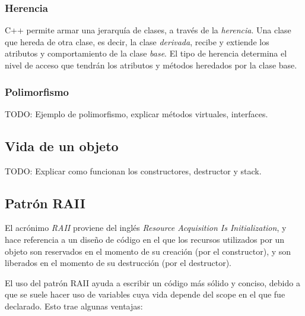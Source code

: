 \documentclass[a4paper, twoside]{article}
\begin{document}
\subsubsection{Herencia}
C++ permite armar una jerarquía de clases, a través de la \emph{herencia}. Una clase que hereda de otra clase, es decir, la clase \emph{derivada}, recibe y extiende los atributos y comportamiento de la clase \emph{base}.
El tipo de herencia determina el nivel de acceso que tendrán los atributos y métodos heredados por la clase base.


\subsubsection{Polimorfismo}
TODO: Ejemplo de polimorfismo, explicar métodos virtuales, interfaces. %

\subsection{Vida de un objeto}
TODO: Explicar como funcionan los constructores, destructor y stack.

\subsection{Patrón RAII}
El acrónimo \emph{RAII} proviene del inglés \emph{Resource Acquisition Is Initialization}, y hace referencia a un diseño de código en el que los recursos utilizados por un objeto son reservados en el momento de su creación (por el constructor), y son liberados en el momento de su destrucción (por el destructor).

El uso del patrón RAII ayuda a escribir un código más sólido y conciso, debido a que se suele hacer uso de variables cuya vida depende del scope en el que fue declarado. Esto trae algunas ventajas:
\end{document}
